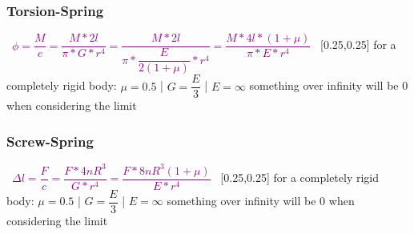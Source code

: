 \documentclass[main.tex,fontsize=8pt,paper=a4,paper=portrait,DIV=calc,]{scrartcl}
\begin{document}
\begin{multicols*}{2}
\subsubsection{Torsion-Spring}
\, \newline
\large \textcolor{purple}{\( \phi = \dfrac{M}{c} = \dfrac{M * 2l}{\pi * G * r^4} = \dfrac{M * 2l}{\pi * \dfrac{E}{2 (1 + \mu)} * r^4} = \dfrac{M * 4l * (1 + \mu)}{\pi * E * r^4}\)}\newline
\, \newline
\normalsize 
{}[0.25,0.25]\newline
for a completely rigid body: \(\mu = 0.5\) | \(G = \dfrac{E}{3}\) | \(E = \infty\)\newline
something over infinity will be 0 when considering the limit

\subsubsection{Screw-Spring}
\, \newline
\large \textcolor{purple}{\( \Delta l = \dfrac{F}{c} = \dfrac{F * 4nR^3}{G * r^4} = \dfrac{F * 8nR^3 (1 + \mu)}{E * r^4}\)}\newline
\, \newline
\normalsize 
{}[0.25,0.25]\newline
for a completely rigid body: \(\mu = 0.5\) | \(G = \dfrac{E}{3}\) | \(E = \infty\)\newline
something over infinity will be 0 when considering the limit


\end{multicols*}
\end{document}
